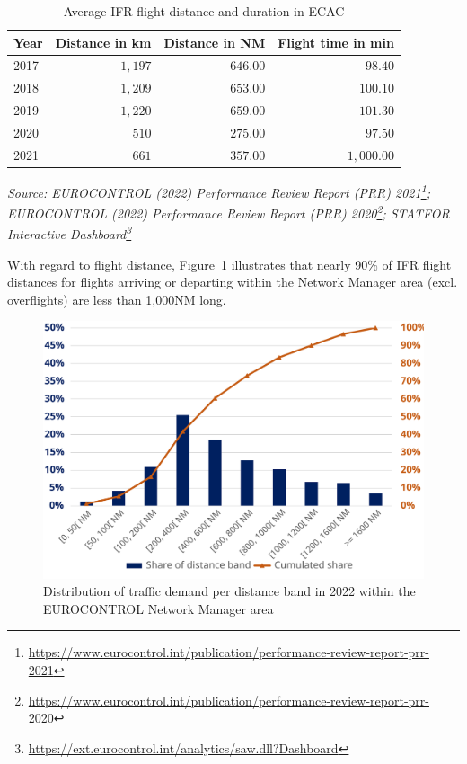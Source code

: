 \documentclass[
  11pt,
  a4paper,
]{book}
\DeclareRobustCommand{\href}[2]{#2\footnote{\url{#1}}}
\begin{document}
\hypertarget{tbl-flight-distance}{}
\setlength{\LTpost}{0mm}
\begin{longtable}{lrrr}
\caption{\label{tbl-flight-distance}Average IFR flight distance and duration in ECAC }\tabularnewline

\toprule
Year & Distance in km & Distance in NM & Flight time in min \\ 
\midrule
2017 & $1,197$ & $646.00$ & $98.40$ \\ 
2018 & $1,209$ & $653.00$ & $100.10$ \\ 
2019 & $1,220$ & $659.00$ & $101.30$ \\ 
2020 & $510$ & $275.00$ & $97.50$ \\ 
2021 & $661$ & $357.00$ & $1,000.00$ \\ 
\bottomrule
\end{longtable}
\begin{minipage}{\linewidth}
\emph{Source: \href{https://www.eurocontrol.int/publication/performance-review-report-prr-2021}{EUROCONTROL (2022) Performance Review Report (PRR) 2021}; \href{https://www.eurocontrol.int/publication/performance-review-report-prr-2020}{EUROCONTROL (2022) Performance Review Report (PRR) 2020}; \href{https://ext.eurocontrol.int/analytics/saw.dll?Dashboard}{STATFOR Interactive Dashboard}}\\
\end{minipage}

With regard to flight distance,
Figure~\ref{fig-traffic-demand-distribution} illustrates that nearly
90\% of IFR flight distances for flights arriving or departing within
the Network Manager area (excl. overflights) are less than 1,000NM long.

\begin{figure}

{\centering \includegraphics{chapters/../figures/traffic_demand_distribution.svg}

}

\caption{\label{fig-traffic-demand-distribution}Distribution of traffic
demand per distance band in 2022 within the EUROCONTROL Network Manager
area}

\end{figure}
\end{document}
